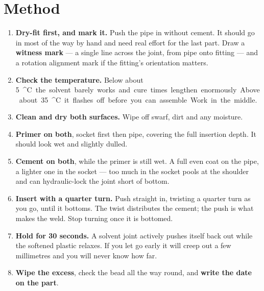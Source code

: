 \section{Method}
\begin{enumerate}
\item \textbf{Dry-fit first, and mark it.} Push the pipe in without cement. It should go in most of the way by hand and need real effort for the last part. Draw a \textbf{witness mark} --- a single line across the joint, from pipe onto fitting --- and a rotation alignment mark if the fitting's orientation matters.
\item \textbf{Check the temperature.} Below about \qty{5}{^\circ C} the solvent barely works and cure times lengthen enormously. Above about \qty{35}{^\circ C} it flashes off before you can assemble. Work in the middle.
\item \textbf{Clean and dry both surfaces.} Wipe off swarf, dirt and any moisture.
\item \textbf{Primer on both}, socket first then pipe, covering the full insertion depth. It should look wet and slightly dulled.
\item \textbf{Cement on both}, while the primer is still wet. A full even coat on the pipe, a lighter one in the socket --- too much in the socket pools at the shoulder and can hydraulic-lock the joint short of bottom.
\item \textbf{Insert with a quarter turn.} Push straight in, twisting a quarter turn as you go, until it bottoms. The twist distributes the cement; the push is what makes the weld. Stop turning once it is bottomed.
\item \textbf{Hold for 30 seconds.} A solvent joint actively pushes itself back out while the softened plastic relaxes. If you let go early it will creep out a few millimetres and you will never know how far.
\item \textbf{Wipe the excess}, check the bead all the way round, and \textbf{write the date on the part}.
\end{enumerate}


